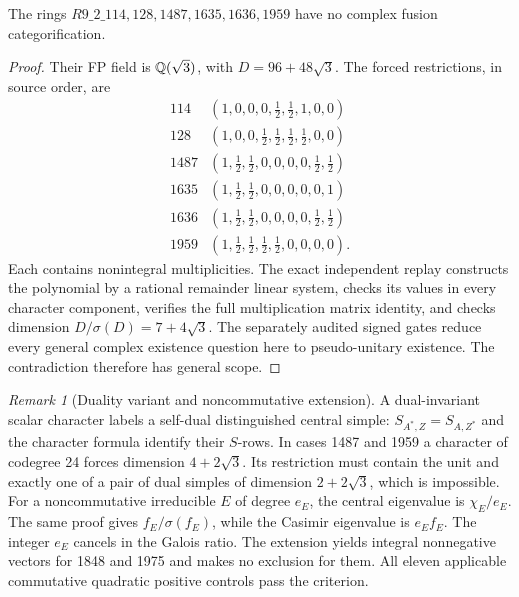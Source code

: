 \documentclass[11pt,a4paper]{article}
\theoremstyle{remark}\newtheorem{remark}[theorem]{Remark}
\begin{document}
\begin{corollary}
The rings $R9\_2\_114,128,1487,1635,1636,1959$ have no complex fusion
categorification.
\end{corollary}
\begin{proof}
Their FP field is $\mathbb Q(\sqrt3)$, with $D=96+48\sqrt3$. The forced
restrictions, in source order, are
\[
\begin{array}{c|c}
114&(1,0,0,0,\tfrac12,\tfrac12,1,0,0)\\
128&(1,0,0,\tfrac12,\tfrac12,\tfrac12,\tfrac12,0,0)\\
1487&(1,\tfrac12,\tfrac12,0,0,0,0,\tfrac12,\tfrac12)\\
1635&(1,\tfrac12,\tfrac12,0,0,0,0,0,1)\\
1636&(1,\tfrac12,\tfrac12,0,0,0,0,\tfrac12,\tfrac12)\\
1959&(1,\tfrac12,\tfrac12,\tfrac12,\tfrac12,0,0,0,0).
\end{array}
\]
Each contains nonintegral multiplicities. The exact independent replay
constructs the polynomial by a rational remainder linear system, checks
its values in every character component, verifies the full multiplication
matrix identity, and checks dimension $D/\sigma(D)=7+4\sqrt3$.
The separately audited signed gates reduce every general complex existence
question here to pseudo-unitary existence. The contradiction therefore has
general scope.
\end{proof}

\begin{remark}[Duality variant and noncommutative extension]
A dual-invariant scalar character labels a self-dual distinguished central
simple: $S_{A^*,Z}=S_{A,Z^*}$ and the character formula identify their
$S$-rows. In cases 1487 and 1959 a character of codegree 24 forces dimension
$4+2\sqrt3$. Its restriction must contain the unit and exactly one of a
pair of dual simples of dimension $2+2\sqrt3$, which is impossible.
For a noncommutative irreducible $E$ of degree $e_E$, the central eigenvalue
is $\chi_E/e_E$. The same proof gives $f_E/\sigma(f_E)$, while the Casimir
eigenvalue is $e_Ef_E$. The integer $e_E$ cancels in the Galois ratio.
The extension yields integral nonnegative vectors for 1848 and 1975 and
makes no exclusion for them. All eleven applicable commutative quadratic
positive controls pass the criterion.
\end{remark}
\end{document}
